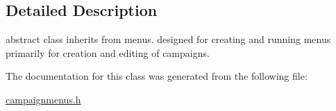 \subsection{Detailed Description}
abstract class inherits from menus. designed for creating and running menus primarily for creation and editing of campaigns. 

The documentation for this class was generated from the following file\+:\begin{DoxyCompactItemize}
\item 
\hyperlink{campaignmenus_8h}{campaignmenus.\+h}\end{DoxyCompactItemize}
